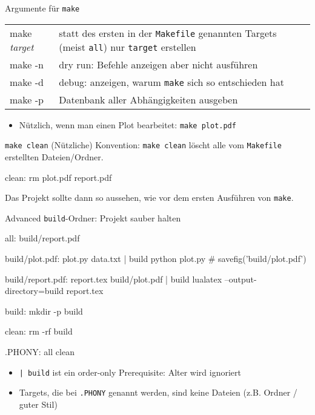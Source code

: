 \begin{frame}[fragile]{Argumente für \texttt{make}}
  \begin{tabu}{>{\ttfamily}l X[,L]}
    make \textit{target} & statt des ersten in der \texttt{Makefile} genannten Targets (meist \texttt{all}) nur \texttt{target} erstellen \\
    make -n              & dry run: Befehle anzeigen aber nicht ausführen \\
    make -d              & debug: anzeigen, warum \texttt{make} sich so entschieden hat \\
    make -p              & Datenbank aller Abhängigkeiten ausgeben
  \end{tabu}
  \begin{itemize}
    \item Nützlich, wenn man einen Plot bearbeitet: \texttt{make plot.pdf}
  \end{itemize}
\end{frame}

\begin{frame}[fragile]{\texttt{make clean}}
  (Nützliche) Konvention: \texttt{make clean} löscht alle vom \texttt{Makefile} erstellten Dateien/Ordner.

  \begin{center}
    \begin{lstmake}
      clean:
          rm plot.pdf report.pdf
    \end{lstmake}
  \end{center}

  Das Projekt sollte dann so aussehen, wie vor dem ersten Ausführen von \texttt{make}.
\end{frame}

\begin{frame}[fragile]{Advanced}
  \texttt{build}-Ordner: Projekt sauber halten

  \begin{center}
    \begin{lstmake}
      all: build/report.pdf

      build/plot.pdf: plot.py data.txt | build
          python plot.py  # savefig('build/plot.pdf')

      build/report.pdf: report.tex build/plot.pdf | build
          lualatex --output-directory=build report.tex

      build:
          mkdir -p build

      clean:
          rm -rf build

      .PHONY: all clean
    \end{lstmake}
  \end{center}

  \begin{itemize}
    \item \texttt{| build} ist ein order-only Prerequisite: Alter wird ignoriert
    \item Targets, die bei \texttt{.PHONY} genannt werden, sind keine Dateien (z.B. Ordner / guter Stil)
  \end{itemize}
\end{frame}

